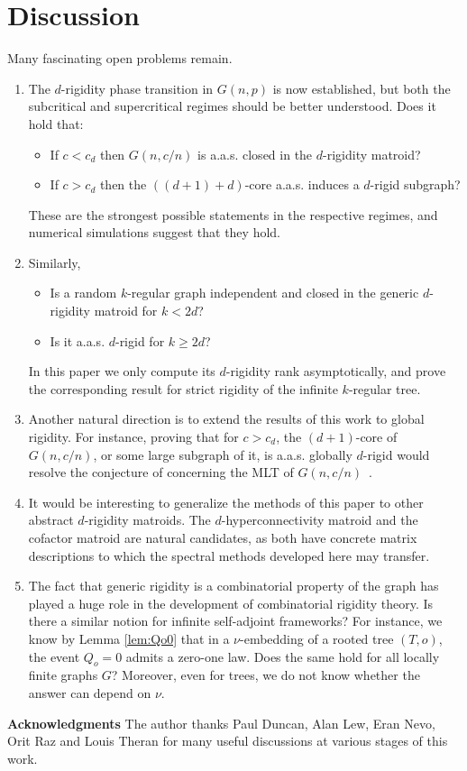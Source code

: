 \documentclass[reqno,english]{amsart}
\numberwithin{equation}{section}
\theoremstyle{definition}{
\newtheorem{example}[theorem]{Example}
\newtheorem{definition}[theorem]{Definition}
\newtheorem*{definition*}{Definition}
\newtheorem{problem}[theorem]{Problem}
\newtheorem{question}[theorem]{Question}
}
\begin{document}
\section{Discussion}\label{sec:discussion}
Many fascinating open problems remain.
\begin{enumerate}
    \item The $d$-rigidity phase transition in $G(n,p)$ is now established, but both the subcritical and supercritical regimes should be better understood.
    Does it hold that:
    \begin{itemize}
        \item If $c<c_d$ then $G(n,c/n)$ is a.a.s. closed in the $d$-rigidity matroid? 
        \item If $c>c_d$ then the $((d+1)+d)$-core a.a.s. induces a $d$-rigid subgraph?
    \end{itemize}
    These are the strongest possible statements in the respective regimes, and numerical simulations suggest that they hold.
    \item Similarly,
    \begin{itemize}
    \item Is a random \(k\)-regular graph independent and closed in the generic \(d\)-rigidity matroid for \(k<2d\)?
    \item Is it a.a.s. \(d\)-rigid for \(k\ge 2d\)? 
\end{itemize}
In this paper we only compute its \(d\)-rigidity rank asymptotically, and
prove the corresponding result for strict rigidity of the infinite \(k\)-regular tree.
\item Another natural direction is to extend the results of this work to global
rigidity. For instance, proving that for \(c>c_d\), the \((d+1)\)-core of
\(G(n,c/n)\), or some large subgraph of it, is a.a.s. globally \(d\)-rigid
would resolve the conjecture of
\cite{BernsteinDewarGortlerNixonSitharamTheranMLT} concerning the MLT of
\(G(n,c/n)\)~\cite{THERAN_PRIVATE}.

    \item It would be interesting to generalize the methods of this paper to
other abstract \(d\)-rigidity matroids. The \(d\)-hyperconnectivity matroid
and the cofactor matroid are natural candidates, as both have concrete
matrix descriptions to which the spectral methods developed here may
transfer.
    \item The fact that generic rigidity is a combinatorial property of the graph has
played a huge role in the development of combinatorial rigidity theory. Is
there a similar notion for infinite self-adjoint frameworks?
For instance, we know by Lemma \ref{lem:Qo0} that in a $\nu$-embedding of a rooted tree
\((T,o)\), the event \(Q_o=0\) admits a zero-one law. Does the same hold for all locally
finite graphs \(G\)? Moreover, even for trees, we do not know whether the answer can depend on \(\nu\).
\end{enumerate}

\noindent \textbf{Acknowledgments}
The author thanks Paul Duncan, Alan Lew, Eran Nevo, Orit Raz and Louis Theran for many useful discussions at various stages of this work.



\end{document}
